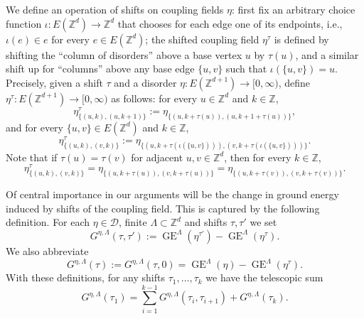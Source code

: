 \documentclass[11pt, reqno]{amsart}
\newcommand{\Z}{\mathbb{Z}}
\DeclareMathOperator{\GE}{GE}
\numberwithin{equation}{section}
\begin{document}
We define an operation of shifts on coupling fields $\eta$: 
first fix an arbitrary choice function $\iota:E({\mathbb Z}^d)\to{\mathbb Z}^d$ that chooses for each edge one of its endpoints, i.e., $\iota(e)\in e$ for every $e\in E({\mathbb Z}^d)$;
the shifted coupling field $\eta^\tau$ is defined by shifting the ``column of disorders'' above a base vertex $u$ by $\tau(u)$, and a similar shift up for ``columns'' above any base edge $\{u,v\}$ such that $\iota(\{u,v\})=u$. 
Precisely, given a shift $\tau$  and a disorder $\eta\colon E({\mathbb Z^{d+1}})\to [0,\infty)$, define $\eta^\tau\colon E({\mathbb Z^{d+1}})\to [0,\infty)$ as follows: for every $u\in\Z^d$ and $k\in{\mathbb Z}$,
\begin{equation}\label{eq:parallel disorder shift}
\eta^{\tau}_{\{(u,k),(u,k+1)\}}:=\eta_{\{(u,k+\tau(u)),(u,k+1+\tau(u))\}},
\end{equation}
and for every $\{u,v\}\in E(\Z^d)$ and $k\in{\mathbb Z}$, 
\begin{equation}\label{eq:transversal disorder shift}
\eta^{\tau}_{\{(u,k),(v,k)\}}:=\eta_{\{(u,k+\tau(\iota(\{u,v\}))),(v,k+\tau(\iota(\{u,v\})))\}}.
\end{equation}
Note that if $\tau(u)=\tau(v)$ for adjacent $u,v\in{\mathbb Z}^d$, then for every $k\in{\mathbb Z}$,
\begin{equation}
\label{eq:shifted_noise_perp}
\eta^{\tau}_{\{(u,k),(v,k)\}}=\eta_{\{(u,k+\tau(u)),(v,k+\tau(u))\}}=\eta_{\{(u,k+\tau(v)),(v,k+\tau(v))\}}.
\end{equation}

 Of central importance in our arguments will be the change in ground energy induced by shifts of the coupling field. 
This is captured by the following definition. For each $\eta\in\mathcal{D}$, finite $\Lambda\subset\Z^d$ and shifts $\tau,\tau'$ we set
\begin{equation}
G^{\eta,\Lambda}(\tau, \tau'):= \GE^{\Lambda}(\eta^{\tau'}) - \GE^{\Lambda}(\eta^{\tau}).
\end{equation}
We also abbreviate
\begin{equation}\label{eq:shift energetic gain}
G^{\eta,\Lambda}(\tau) := G^{\eta,\Lambda}(\tau,0)= \GE^{\Lambda}(\eta) - \GE^{\Lambda}(\eta^{\tau}).
\end{equation}
With these definitions, for any shifts $\tau_1,\ldots, \tau_k$ we have the telescopic sum
\begin{equation}\label{eq:telescopic sum}
G^{\eta,\Lambda}(\tau_1) = \sum_{i=1}^{k-1} G^{\eta,\Lambda}(\tau_i,\tau_{i+1}) + G^{\eta,\Lambda}(\tau_k).
\end{equation}
\end{document}
